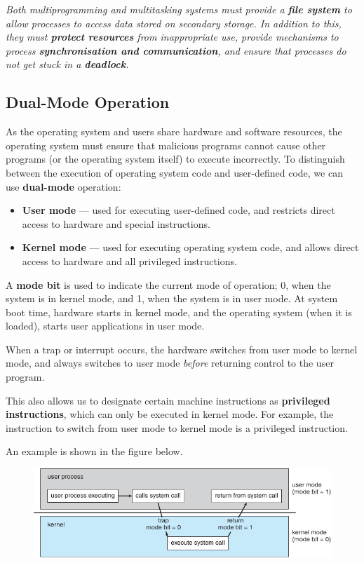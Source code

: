 \documentclass{article}
\begin{document}
\emph{Both multiprogramming and multitasking systems must provide a \textbf{file system} to allow processes to access data stored on secondary storage.
    In addition to this, they must \textbf{protect resources} from inappropriate use, provide mechanisms to process \textbf{synchronisation and communication}, and
    ensure that processes do not get stuck in a \textbf{deadlock}.}
\subsection{Dual-Mode Operation}
As the operating system and users share hardware and software resources, the operating system must ensure that
malicious programs cannot cause other programs (or the operating system itself) to execute incorrectly.
To distinguish between the execution of operating system code and user-defined code, we can use
\textbf{dual-mode} operation:
\begin{itemize}
    \item \textbf{User mode} --- used for executing user-defined code, and restricts direct access to hardware and special instructions.
    \item \textbf{Kernel mode} --- used for executing operating system code, and allows direct access to hardware and all privileged instructions.
\end{itemize}
A \textbf{mode bit} is used to indicate the current mode of operation; 0, when the system is in kernel mode, and 1, when the system is in user mode.
At system boot time, hardware starts in kernel mode, and the operating system (when it is loaded), starts user applications in user mode.

When a trap or interrupt occurs, the hardware switches from user mode to kernel mode, and always switches to user mode \textit{before}
returning control to the user program.

This also allows us to designate certain machine instructions as \textbf{privileged instructions}, which can only be executed in kernel mode.
For example, the instruction to switch from user mode to kernel mode is a privileged instruction.

An example is shown in the figure below.
\begin{figure}[H]
    \centering
    \includegraphics[width = \linewidth]{figures/dual_mode.pdf}
\end{figure}
\end{document}
